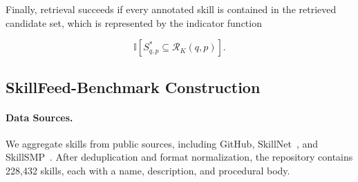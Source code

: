 \documentclass[letterpaper]{article} %
\begin{document}
Finally, retrieval succeeds if every annotated skill is contained in the retrieved candidate set, which is represented by the indicator function

\begin{equation}
\mathbb{I}\!\left[
S^*_{q,p}\subseteq
\mathcal{R}_K(q,p)
\right].
\end{equation}
\fi





\subsection{SkillFeed-Benchmark Construction}

\paragraph{Data Sources.}
We aggregate skills from public sources, including GitHub, SkillNet~\cite{liang2026skillnetcreateevaluateconnect}, and SkillSMP~\cite{skillsmp2026}. After deduplication and format normalization, the repository contains 228,432 skills, each with a name, description, and procedural body.
\end{document}
